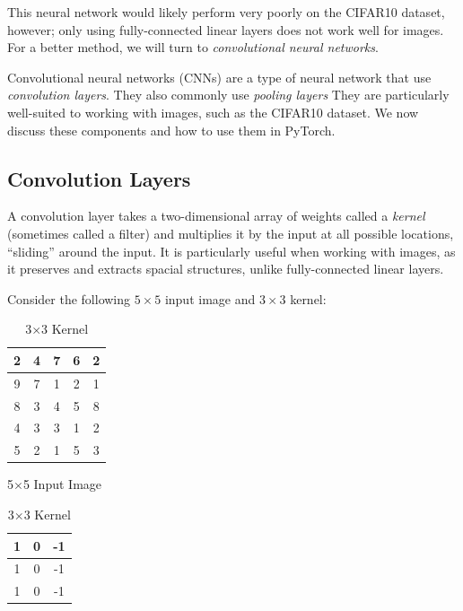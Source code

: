 This neural network would likely perform very poorly on the CIFAR10 dataset, however; only using fully-connected linear layers does not work well for images.
For a better method, we will turn to \emph{convolutional neural networks}.

Convolutional neural networks (CNNs) are a type of neural network that use \emph{convolution layers}.
They also commonly use \emph{pooling layers}
They are particularly well-suited to working with images, such as the CIFAR10 dataset.
We now discuss these components and how to use them in PyTorch.

\subsection*{Convolution Layers}
A convolution layer takes a two-dimensional array of weights called a \emph{kernel} (sometimes called a filter) and multiplies it by the input at all possible locations, ``sliding'' around the input.
It is particularly useful when working with images, as it preserves and extracts spacial structures, unlike fully-connected linear layers.

Consider the following $5\times 5$ input image and $3\times 3$ kernel:
\begin{table}[H]
\parbox{.45\linewidth}{
\centering
\begin{tabular}{|c|c|c|c|c|}
\hline
2 & 4 & 7 & 6 & 2\\
\hline
9 & 7 & 1 & 2 & 1\\
\hline
8 & 3 & 4 & 5 & 8\\
\hline
4 & 3 & 3 & 1 & 2\\
\hline
5 & 2 & 1 & 5 & 3\\
\hline
\end{tabular}
\label{tab:input}
\caption*{5$\times$5 Input Image}
}
\hfill
\parbox{.45\linewidth}{
\centering
\begin{tabular}{|c|c|c|}
\hline
1 & 0 & -1\\
\hline
1 & 0 & -1\\
\hline
1 & 0 & -1\\
\hline
\end{tabular}
\label{tab:input}
\caption*{3$\times$3 Kernel}
}
\end{table}

